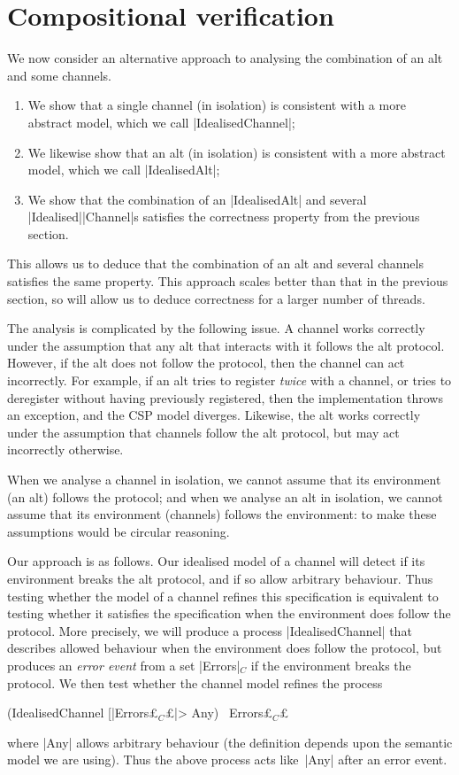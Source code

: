 \section{Compositional verification}
\label{sec:compositional}

\inlineCSP

We now consider an alternative approach to analysing the combination of an alt
and some channels.  
%
\begin{enumerate}
\item We show that a single channel (in isolation) is consistent with a more
  abstract model, which we call |IdealisedChannel|;

\item We likewise show that an alt (in isolation) is consistent with a more
  abstract model, which we call |IdealisedAlt|;

\item We show that the combination of an |IdealisedAlt| and several
  |Idealised|\-|Channel|s satisfies the correctness property from the previous
  section.
\end{enumerate}
%
This allows us to deduce that the combination of an alt and several channels
satisfies the same property. This approach scales better than that in the
previous section, so will allow us to deduce correctness for a larger number
of threads.

The analysis is complicated by the following issue.  A channel works correctly
under the assumption that any alt that interacts with it follows the alt
protocol.  However, if the alt does not follow the protocol, then the channel
can act incorrectly.  For example, if an alt tries to register \emph{twice}
with a channel, or tries to deregister without having previously registered,
then the implementation throws an exception, and the CSP model diverges.
Likewise, the alt works correctly under the assumption that channels follow
the alt protocol, but may act incorrectly otherwise.

When we analyse a channel in isolation, we cannot assume that its environment
(an alt) follows the protocol; and when we analyse an alt in isolation, we
cannot assume that its environment (channels) follows the environment: to make
these assumptions would be circular reasoning. 

Our approach is as follows.  Our idealised model of a channel will detect if
its environment breaks the alt protocol, and if so allow arbitrary behaviour.
Thus testing whether the model of a channel refines this specification is
equivalent to testing whether it satisfies the specification when the
environment does follow the protocol.  More precisely, we will produce a
process |IdealisedChannel| that describes allowed behaviour when the environment
does follow the protocol, but produces an \emph{error event} from a set
|Errors|$_C$ if the environment breaks the protocol.  We then test whether the
channel model refines the process
%
\begin{cspm}
(IdealisedChannel [|Errors£$_C$£|> Any) \ Errors£$_C$£
\end{cspm}
%
where |Any| allows arbitrary behaviour (the definition depends upon the
semantic model we are using).  Thus the above process acts like~|Any| after an
error event. 

